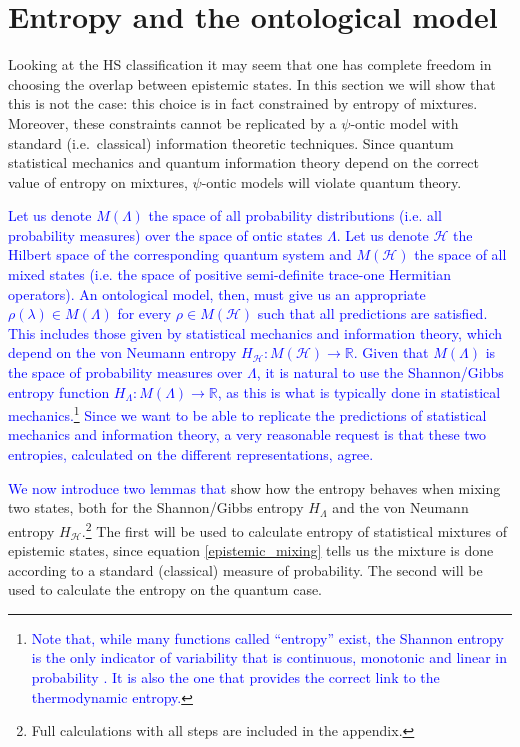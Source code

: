 \documentclass[10pt,twocolumn, nofootinbib]{revtex4-2}
\begin{document}
\section{Entropy and the ontological model}

Looking at the HS classification it may seem that one has complete freedom in choosing the overlap between epistemic states. In this section we will show that this is not the case: this choice is in fact constrained by entropy of mixtures. Moreover, these constraints cannot be replicated by a $\psi$-ontic model with standard (i.e.\ classical) information theoretic techniques. Since quantum statistical mechanics and quantum information theory depend on the correct value of entropy on mixtures, $\psi$-ontic models will violate quantum theory.

\textcolor{blue}{Let us denote $M(\Lambda)$ the space of all probability distributions (i.e. all probability measures) over the space of ontic states $\Lambda$. Let us denote $\mathcal{H}$ the Hilbert space of the corresponding quantum system and $M(\mathcal{H})$ the space of all mixed states (i.e. the space of positive semi-definite trace-one Hermitian operators). An ontological model, then, must give us an appropriate $\rho(\lambda) \in M(\Lambda)$ for every $\rho \in M(\mathcal{H})$ such that all predictions are satisfied. This includes those given by statistical mechanics and information theory, which depend on the von Neumann entropy $H_\mathcal{H} : M(\mathcal{H}) \to \mathbb{R}$. Given that $M(\Lambda)$ is the space of probability measures over $\Lambda$, it is natural to use the Shannon/Gibbs entropy function $H_\Lambda : M(\Lambda) \to \mathbb{R}$, as this is what is typically done in statistical mechanics.\footnote{\textcolor{blue}{Note that, while many functions called ``entropy'' exist, the Shannon entropy is the only indicator of variability that is continuous, monotonic and linear in probability \cite{Carcassi:2021}. It is also the one that provides the correct link to the thermodynamic entropy.}} Since we want to be able to replicate the predictions of statistical mechanics and information theory, a very reasonable request is that these two entropies, calculated on the different representations, agree.}

\textcolor{blue}{We now introduce two lemmas that} show how the entropy behaves when mixing two states, both for the Shannon/Gibbs entropy $H_\Lambda$ and the von Neumann entropy $H_\mathcal{H}$.\footnote{Full calculations with all steps are included in the appendix.} The first will be used to calculate entropy of statistical mixtures of epistemic states, since equation \ref{epistemic_mixing} tells us the mixture is done according to a standard (classical) measure of probability. The second will be used to calculate the entropy on the quantum case.
\end{document}
